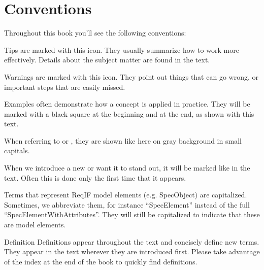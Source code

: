 % 

\section{Conventions}
\label{sec:conventions}

Throughout this book you'll see the following conventions:

\begin{info}
Tips are marked with this icon.  They usually summarize how to work more effectively.  Details about the subject matter are found in the text.
\end{info}

\begin{warning}
Warnings are marked with this icon. They point out things that can go wrong, or important steps that are easily missed.
\end{warning}

\begin{example}
Examples often demonstrate how a concept is applied in practice.  They will be marked with a black square at the beginning and at the end, as shown with this text.
\end{example}

When referring to  or , they are shown like here on gray background in small capitals.

When we introduce a new  or want it to stand out, it will be marked like  in the text.  Often this is done only the first time that it appears.

Terms that represent ReqIF model elements (e.g. SpecObject) are capitalized. Sometimes, we abbreviate them, for instance ``SpecElement'' instead of the full ``SpecElementWithAttributes''.  They will still be capitalized to indicate that these are model elements.

\begin{definition}{Definition}
Definitions appear throughout the text and concisely define new terms.  They appear in the text wherever they are introduced first.  Please take advantage of the index at the end of the book to quickly find definitions.
\end{definition}
